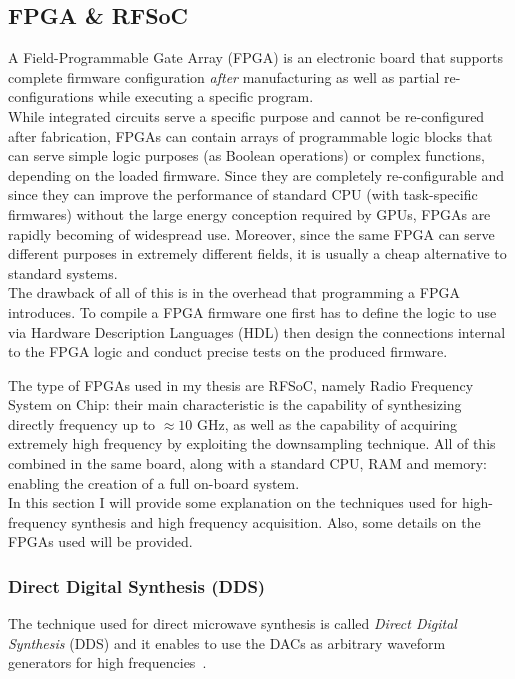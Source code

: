 \subsection{FPGA \& RFSoC}

A Field-Programmable Gate Array (FPGA) is an electronic board that supports complete firmware configuration \textit{after} manufacturing as well as partial re-configurations while executing a specific program.\\
While integrated circuits serve a specific purpose and cannot be re-configured after fabrication, FPGAs can contain arrays of programmable logic blocks that can serve simple logic purposes (as Boolean operations) or complex functions, depending on the loaded firmware.
Since they are completely re-configurable and since they can improve the performance of standard CPU (with task-specific firmwares) without the large energy conception required by GPUs, FPGAs are rapidly becoming of widespread use.
Moreover, since the same FPGA can serve different purposes in extremely different fields, it is usually a cheap alternative to standard systems.\\
The drawback of all of this is in the overhead that programming a FPGA introduces.
To compile a FPGA firmware one first has to define the logic to use via Hardware Description Languages (HDL) then design the connections internal to the FPGA logic and conduct precise tests on the produced firmware.

The type of FPGAs used in my thesis are RFSoC, namely Radio Frequency System on Chip: their main characteristic is the capability of synthesizing directly frequency up to $\approx 10$ GHz, as well as the capability of acquiring extremely high frequency by exploiting the downsampling technique. 
All of this combined in the same board, along with a standard CPU, RAM and memory: enabling the creation of a full on-board system.\\
In this section I will provide some explanation on the techniques used for high-frequency synthesis and high frequency acquisition. 
Also, some details on the FPGAs used will be provided.

\subsubsection{Direct Digital Synthesis (DDS)}
The technique used for direct microwave synthesis is called \textit{Direct Digital Synthesis} (DDS) and it enables to use the DACs as arbitrary waveform generators for high frequencies~\cite{DDS}.

